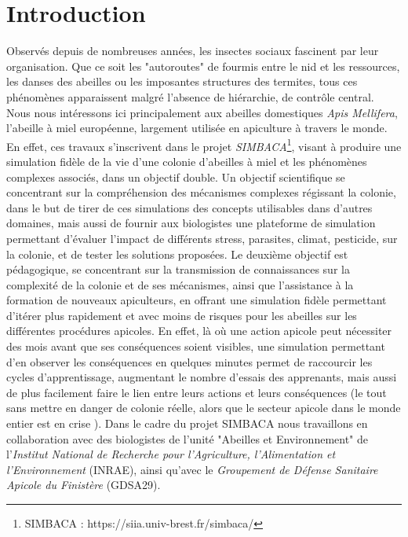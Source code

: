 \chapter*{Introduction}


	Observés depuis de nombreuses années, les insectes sociaux fascinent par leur organisation. Que ce soit les "autoroutes" de fourmis entre le nid et les ressources, les danses des abeilles ou les imposantes structures des termites, tous ces phénomènes apparaissent malgré l'absence de hiérarchie, de contrôle central. Nous nous intéressons ici principalement aux abeilles domestiques \textit{Apis Mellifera}, l'abeille à miel européenne, largement utilisée en apiculture à travers le monde. 
	En effet, ces travaux s'inscrivent dans le projet \textit{SIMBACA}\footnote{SIMBACA : https://siia.univ-brest.fr/simbaca/}, visant à produire une simulation fidèle de la vie d'une colonie d'abeilles à miel et les phénomènes complexes associés, dans un objectif double. Un objectif scientifique se concentrant sur la compréhension des mécanismes complexes régissant la colonie, dans le but de tirer de ces simulations des concepts utilisables dans d'autres domaines, mais aussi de fournir aux biologistes une plateforme de simulation permettant d'évaluer l'impact de différents stress, parasites, climat, pesticide, sur la colonie, et de tester les solutions proposées. 
	Le deuxième objectif est pédagogique, se concentrant sur la transmission de connaissances sur la complexité de la colonie et de ses mécanismes, ainsi que l'assistance à la formation de nouveaux apiculteurs, en offrant une simulation fidèle permettant d'itérer plus rapidement et avec moins de risques pour les abeilles sur les différentes procédures apicoles. En effet, là où une action apicole peut nécessiter des mois avant que ses conséquences soient visibles, une simulation permettant d'en observer les conséquences en quelques minutes permet de raccourcir les cycles d'apprentissage, augmentant le nombre d'essais des apprenants, mais aussi de plus facilement faire le lien entre leurs actions et leurs conséquences (le tout sans mettre en danger de colonie réelle, alors que le secteur apicole dans le monde entier est en crise \cite{johnson_honey_2010}). Dans le cadre du projet SIMBACA nous travaillons en collaboration avec des biologistes de l'unité "Abeilles et Environnement" de l'\textit{Institut National de Recherche pour l'Agriculture, l'Alimentation et l'Environnement} (INRAE), ainsi qu'avec le \textit{Groupement de Défense Sanitaire Apicole du Finistère} (GDSA29).

